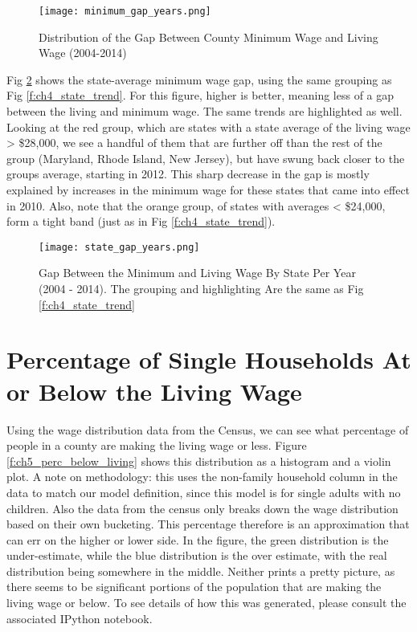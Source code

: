 \begin{figure}[H]
    \centering
        \texttt{[image: minimum\_gap\_years.png]}
        \caption{Distribution of the Gap Between County Minimum Wage and Living Wage (2004-2014)}
    \label{f:ch5_minimum_gap_years}
\end{figure}

Fig \ref{f:ch5_state_gap_years} shows the state-average minimum wage gap, using the same grouping as Fig \ref{f:ch4_state_trend}. For this figure, higher is better, meaning less of a gap between the living and minimum wage. The same trends are highlighted as well. Looking at the red group, which are states with a state average of the living wage > \$28,000, we see a handful of them that are further off than the rest of the group (Maryland, Rhode Island, New Jersey), but have swung back closer to the groups average, starting in 2012. This sharp decrease in the gap is mostly explained by increases in the minimum wage for these states that came into effect in 2010. Also, note that the orange group, of states with averages < \$24,000, form a tight band (just as in Fig \ref{f:ch4_state_trend}).

\begin{figure}[H]
    \centering
        \texttt{[image: state\_gap\_years.png]}
        \caption{Gap Between the Minimum and Living Wage By State Per Year (2004 - 2014). The grouping and highlighting Are the same as Fig \ref{f:ch4_state_trend}}
    \label{f:ch5_state_gap_years}
\end{figure}

\section{Percentage of Single Households At or Below the Living Wage}

Using the wage distribution data from the Census, we can see what percentage of people in a county are making the living wage or less. Figure \ref{f:ch5_perc_below_living} shows this distribution as a histogram and a violin plot. A note on methodology: this uses the non-family household column in the data to match our model definition, since this model is for single adults with no children. Also the data from the census only breaks down the wage distribution based on their own bucketing. This percentage therefore is an approximation that can err on the higher or lower side. In the figure, the green distribution is the under-estimate, while the blue distribution is the over estimate, with the real distribution being somewhere in the middle. Neither prints a pretty picture, as there seems to be significant portions of the population that are making the living wage or below. To see details of how this was generated, please consult the associated IPython notebook.


